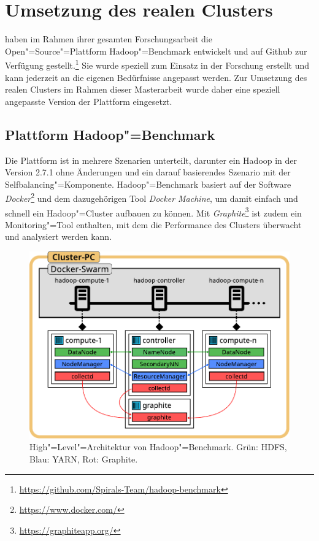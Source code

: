 \section{Umsetzung des realen Clusters}\label{sec:aufbauCluster}

\citeauthor{zhang2016} haben im Rahmen ihrer gesamten Forschungsarbeit die Open"=Source"=Plattform Hadoop"=Benchmark entwickelt und auf Github zur Verfügung gestellt.\footnote{\url{https://github.com/Spirals-Team/hadoop-benchmark}}
Sie wurde speziell zum Einsatz in der Forschung erstellt und kann jederzeit an die eigenen Bedürfnisse angepasst werden.
Zur Umsetzung des realen Clusters im Rahmen dieser Masterarbeit wurde daher eine speziell angepasste Version der Plattform eingesetzt.

\subsection{Plattform Hadoop"=Benchmark}\label{sec:hadoopBenchmark}

Die Plattform ist in mehrere Szenarien unterteilt, darunter ein Hadoop in der Version 2.7.1 ohne Änderungen und ein darauf basierendes Szenario mit der Selfbalancing"=Komponente.
Hadoop"=Benchmark basiert auf der Software \emph{Docker}\footnote{\url{https://www.docker.com/}} und dem dazugehörigen Tool \emph{Docker Machine}, um damit einfach und schnell ein Hadoop"=Cluster aufbauen zu können.
Mit \emph{Graphite}\footnote{\url{https://graphiteapp.org/}} ist zudem ein Monitoring"=Tool enthalten, mit dem die Performance des Clusters überwacht und analysiert werden kann.

\begin{figure}
    \includegraphics{./images/hadoopBenchmarkArch.pdf}
    \caption[High"=Level"=Architektur von Hadoop"=Benchmark]
    {High"=Level"=Architektur von Hadoop"=Benchmark.
        Grün: \ac{HDFS}, Blau: YARN, Rot: Graphite.}
    \label{fig:hadoopBenchmarkArchitecture}
\end{figure}

